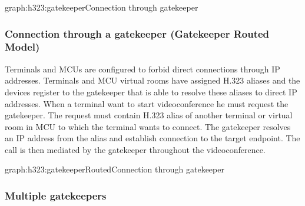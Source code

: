 \documentclass[a4paper]{report}
\begin{document}
\begin{Graph}{graph:h323:gatekeeper}{Connection through gatekeeper}{}
  
  
\end{Graph}

\subsubsection{Connection through a gatekeeper (Gatekeeper Routed Model)}

Terminals and MCUs are configured to forbid direct connections through IP addresses. Terminals and MCU virtual rooms have assigned H.323 aliases and the devices register to the gatekeeper that is able to resolve these aliases to direct IP addresses. When a terminal want to start videoconference he must request the gatekeeper. The request must contain H.323 alias of another terminal or virtual room in MCU to which the terminal wants to connect. The gatekeeper resolves an IP address from the alias and establish connection to the target endpoint. The call is then mediated by the gatekeeper throughout the videoconference.

\begin{Graph}{graph:h323:gatekeeperRouted}{Connection through gatekeeper}{}
  
  
\end{Graph}

\subsubsection{Multiple gatekeepers}
\end{document}
